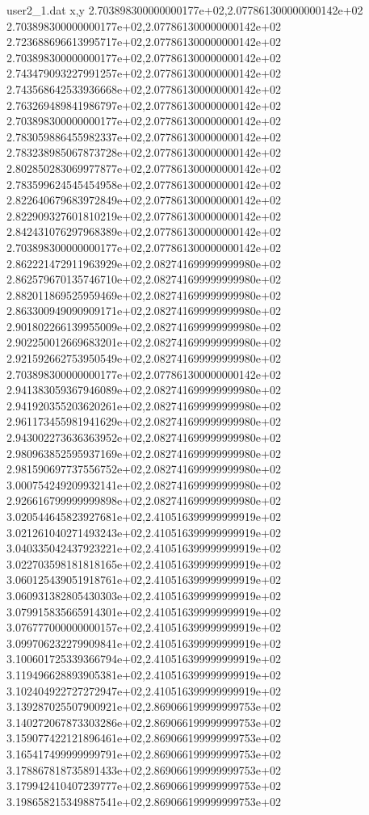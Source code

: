 \begin{filecontents}{user2_1.dat}
x,y
2.703898300000000177e+02,2.077861300000000142e+02
2.703898300000000177e+02,2.077861300000000142e+02
2.723688696613995717e+02,2.077861300000000142e+02
2.703898300000000177e+02,2.077861300000000142e+02
2.743479093227991257e+02,2.077861300000000142e+02
2.743568642533936668e+02,2.077861300000000142e+02
2.763269489841986797e+02,2.077861300000000142e+02
2.703898300000000177e+02,2.077861300000000142e+02
2.783059886455982337e+02,2.077861300000000142e+02
2.783238985067873728e+02,2.077861300000000142e+02
2.802850283069977877e+02,2.077861300000000142e+02
2.783599624545454958e+02,2.077861300000000142e+02
2.822640679683972849e+02,2.077861300000000142e+02
2.822909327601810219e+02,2.077861300000000142e+02
2.842431076297968389e+02,2.077861300000000142e+02
2.703898300000000177e+02,2.077861300000000142e+02
2.862221472911963929e+02,2.082741699999999980e+02
2.862579670135746710e+02,2.082741699999999980e+02
2.882011869525959469e+02,2.082741699999999980e+02
2.863300949090909171e+02,2.082741699999999980e+02
2.901802266139955009e+02,2.082741699999999980e+02
2.902250012669683201e+02,2.082741699999999980e+02
2.921592662753950549e+02,2.082741699999999980e+02
2.703898300000000177e+02,2.077861300000000142e+02
2.941383059367946089e+02,2.082741699999999980e+02
2.941920355203620261e+02,2.082741699999999980e+02
2.961173455981941629e+02,2.082741699999999980e+02
2.943002273636363952e+02,2.082741699999999980e+02
2.980963852595937169e+02,2.082741699999999980e+02
2.981590697737556752e+02,2.082741699999999980e+02
3.000754249209932141e+02,2.082741699999999980e+02
2.926616799999999898e+02,2.082741699999999980e+02
3.020544645823927681e+02,2.410516399999999919e+02
3.021261040271493243e+02,2.410516399999999919e+02
3.040335042437923221e+02,2.410516399999999919e+02
3.022703598181818165e+02,2.410516399999999919e+02
3.060125439051918761e+02,2.410516399999999919e+02
3.060931382805430303e+02,2.410516399999999919e+02
3.079915835665914301e+02,2.410516399999999919e+02
3.076777000000000157e+02,2.410516399999999919e+02
3.099706232279909841e+02,2.410516399999999919e+02
3.100601725339366794e+02,2.410516399999999919e+02
3.119496628893905381e+02,2.410516399999999919e+02
3.102404922727272947e+02,2.410516399999999919e+02
3.139287025507900921e+02,2.869066199999999753e+02
3.140272067873303286e+02,2.869066199999999753e+02
3.159077422121896461e+02,2.869066199999999753e+02
3.165417499999999791e+02,2.869066199999999753e+02
3.178867818735891433e+02,2.869066199999999753e+02
3.179942410407239777e+02,2.869066199999999753e+02
3.198658215349887541e+02,2.869066199999999753e+02

\end{filecontents}
